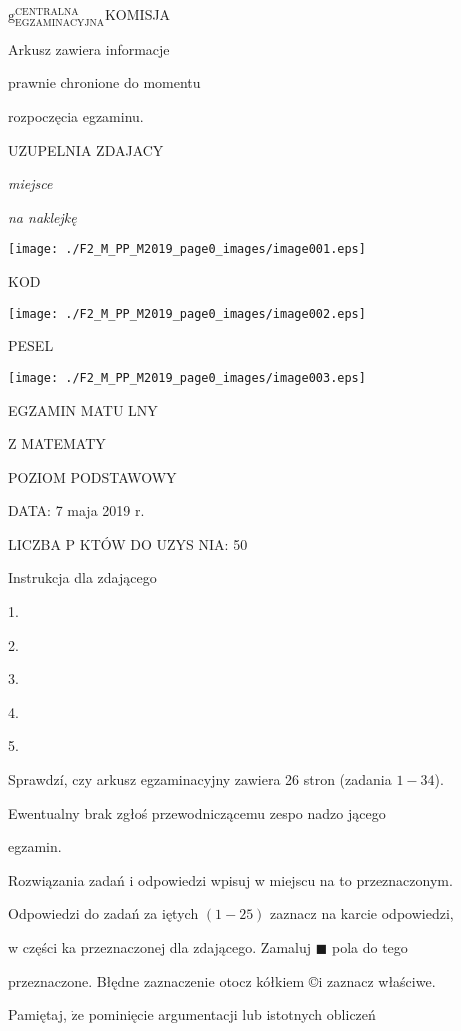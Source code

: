 \documentclass[a4paper,12pt]{article}
\begin{document}
$\mathrm{g}_{\mathrm{E}\mathrm{G}\mathrm{Z}\mathrm{A}\mathrm{M}\mathrm{I}\mathrm{N}\mathrm{A}\mathrm{C}\mathrm{Y}\mathrm{J}\mathrm{N}\mathrm{A}}^{\mathrm{C}\mathrm{E}\mathrm{N}\mathrm{T}\mathrm{R}\mathrm{A}\mathrm{L}\mathrm{N}\mathrm{A}}$KOMISJA

Arkusz zawiera informacje

prawnie chronione do momentu

rozpoczęcia egzaminu.

UZUPELNIA ZDAJACY

{\it miejsce}

{\it na naklejkę}
\begin{center}
\texttt{[image: ./F2\_M\_PP\_M2019\_page0\_images/image001.eps]}
\end{center}
KOD
\begin{center}
\texttt{[image: ./F2\_M\_PP\_M2019\_page0\_images/image002.eps]}
\end{center}
PESEL
\begin{center}
\texttt{[image: ./F2\_M\_PP\_M2019\_page0\_images/image003.eps]}
\end{center}
EGZAMIN MATU  LNY

Z MATEMATY

POZIOM PODSTAWOWY

DATA: 7 maja 2019 $\mathrm{r}.$

LICZBA P KTÓW DO UZYS NIA: 50

Instrukcja dla zdającego

1.

2.

3.

4.

5.

Sprawdzí, czy arkusz egzaminacyjny zawiera 26 stron (zadania $1-34$).

Ewentualny brak zgłoś przewodniczącemu zespo nadzo jącego

egzamin.

Rozwiązania zadań i odpowiedzi wpisuj w miejscu na to przeznaczonym.

Odpowiedzi do zadań za iętych $(1-25)$ zaznacz na karcie odpowiedzi,

w części ka przeznaczonej dla zdającego. Zamaluj $\blacksquare$ pola do tego

przeznaczone. Błędne zaznaczenie otocz kółkiem \copyright i zaznacz właściwe.

Pamiętaj, $\dot{\mathrm{z}}\mathrm{e}$ pominięcie argumentacji lub istotnych obliczeń
\end{document}
